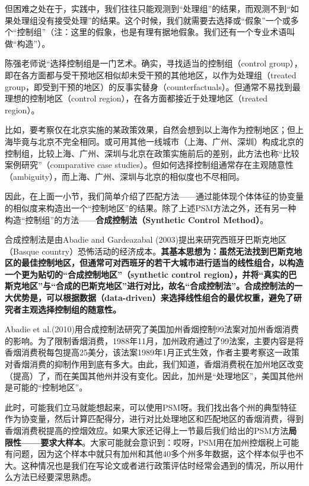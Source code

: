 \documentclass[cn,12pt,math=newtx,citestyle=gb7714-2015,bibstyle=gb7714-2015]{elegantbook}
\begin{document}
	但困难之处在于，实践中，我们往往只能观测到“处理组”的结果，而观测不到“如果处理组没有接受处理”的结果。这个时候，我们就需要去选择或“假象”一个或多个“控制组”（注：这里的假象，也是有理有据地假象。我们还有一个专业术语叫做“构造”）。
	
	陈强老师说“选择控制组是一门艺术。确实，寻找适当的控制组（control group），即在各方面都与受干预地区相似却未受干预的其他地区，以作为处理组（treated group，即受到干预的地区）的反事实替身（counterfactuals）。但通常不易找到最理想的控制地区（control region），在各方面都接近于处理地区（treated region）。
	
	比如，要考察仅在北京实施的某政策效果，自然会想到以上海作为控制地区；但上海毕竟与北京不完全相同。或可用其他一线城市（上海、广州、深圳）构成北京的控制组，比较上海、广州、深圳与北京在政策实施前后的差别，此方法也称“比较案例研究”（comparative case studies）。但如何选择控制组通常存在主观随意性（ambiguity），而上海、广州、深圳与北京的相似度也不尽相同。
	
	因此，在上面一小节，我们简单介绍了匹配方法——通过能体现个体体征的协变量的相似度来构造出一个“控制地区”的结果。除了上述PSM方法之外，还有另一种构造“控制组”的方法——\textbf{合成控制法（Synthetic Control Method）}。
	
	合成控制法是由Abadie and Gardeazabal (2003)提出来研究西班牙巴斯克地区（Basque country）恐怖活动的经济成本。\textbf{其基本思想为：虽然无法找到巴斯克地区的最佳控制地区，但通常可对西班牙的若干大城市进行适当的线性组合，以构造一个更为贴切的“合成控制地区”（synthetic control region），并将“真实的巴斯克地区”与“合成的巴斯克地区”进行对比，故名“合成控制法”。合成控制法的一大优势是，可以根据数据（data-driven）来选择线性组合的最优权重，避免了研究者主观选择控制组的随意性。}
	
	Abadie et al.(2010)用合成控制法研究了美国加州香烟控制99法案对加州香烟消费的影响。为了限制香烟消费，1988年11月，加州政府通过了99法案，主要内容是将香烟消费税每包提高25美分，该法案1989年1月正式生效，作者主要考察这一政策对香烟消费的抑制作用到底有多大。由此，我们知道，香烟消费税在加州地区改变（提高）了，而在美国其他州并没有变化。因此，加州是“处理地区”，美国其他州是可能的“控制地区”。
	
	此时，可能我们立马就能想起来，可以使用PSM呀。我们找出各个州的典型特征作为协变量，然后计算匹配得分，进行对比处理地区和匹配地区的香烟消费，得到香烟消费税提高的控烟效应。如果大家还记得上一节最后我们给出的PSM方法\textbf{局限性——要求大样本}。大家可能就会意识到：哎呀，PSM用在加州控烟税上可能有问题，因为这个样本中就只有加州和其他40多个州多年数据，这个样本似乎也不大。这种情况也是我们在写论文或者进行政策评估时经常会遇到的情况，所以用什么方法已经要深思熟虑。
	
\end{document}
